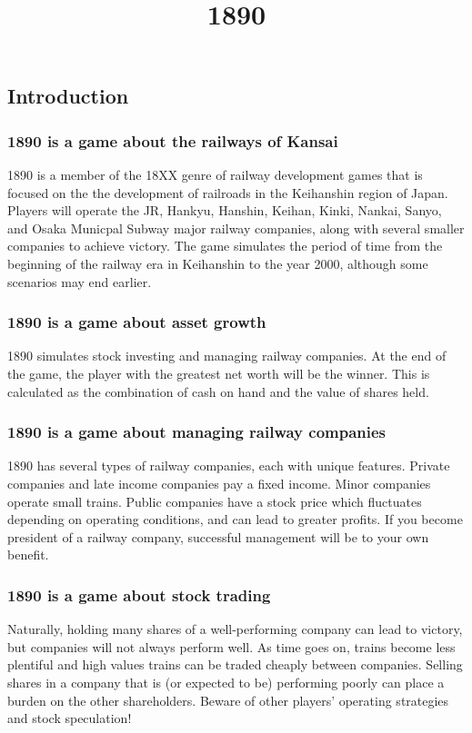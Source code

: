 \documentclass{article}
\title{1890}
\begin{document}
\begin{CJK}{UTF8}{min}
\section*{Introduction}

\subsubsection*{1890 is a game about the railways of Kansai}
1890 is a member of the 18XX genre of railway development games that
is focused on the the development of railroads in the Keihanshin
region of Japan. Players will operate the JR, Hankyu, Hanshin, Keihan,
Kinki, Nankai, Sanyo, and Osaka Municpal Subway major railway
companies, along with several smaller companies to achieve
victory. The game simulates the period of time from the beginning of
the railway era in Keihanshin to the year 2000, although some
scenarios may end earlier.

\subsubsection*{1890 is a game about asset growth}
1890 simulates stock investing and managing railway companies. At the end
of the game, the player with the greatest net worth will be the
winner. This is calculated as the combination of cash on hand and
the value of shares held.

\subsubsection*{1890 is a game about managing railway companies}
1890 has several types of railway companies, each with unique
features. Private companies and late income companies pay a fixed
income. Minor companies operate small trains. Public companies have a
stock price which fluctuates depending on operating conditions, and
can lead to greater profits. If you become president of a railway
company, successful management will be to your own benefit.

\subsubsection*{1890 is a game about stock trading}
Naturally, holding many shares of a well-performing company can lead
to victory, but companies will not always perform well. As time goes
on, trains become less plentiful and high values trains can be traded
cheaply between companies. Selling shares in a company that is (or
expected to be) performing poorly can place a burden on the other
shareholders. Beware of other players' operating strategies and stock
speculation!


\end{CJK}
\end{document}
